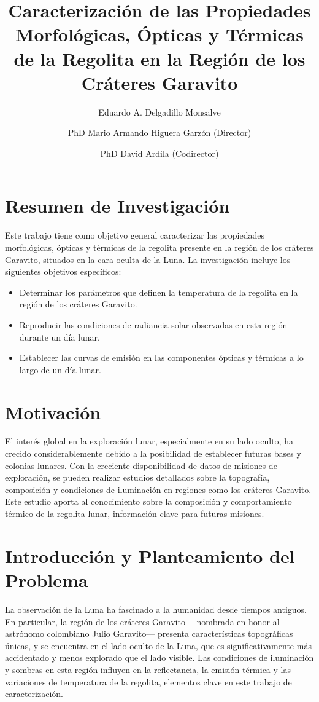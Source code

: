 \documentclass[12pt]{article}
\title{\Large\textbf{Caracterización de las Propiedades Morfológicas, Ópticas y Térmicas de la Regolita en la Región de los Cráteres Garavito}}
\author[1]{\raggedright Eduardo A. Delgadillo Monsalve}
\author[2]{\raggedright PhD Mario Armando Higuera Garzón (Director)}
\author[3]{\raggedright PhD David Ardila (Codirector)}
\affil[1]{\raggedright\small MSc estudiante - Astronomía (eadelgadillom@unal.edu.co) \newline \small Observatorio Astronómico Nacional, Universidad Nacional de Colombia}
\affil[2]{\raggedright\small Observatorio Astronómico Nacional, Universidad Nacional de Colombia}
\affil[3]{\raggedright\small Jet Propulsion Laboratory, NASA}
\date{}
\begin{document}
\maketitle

\section*{Resumen de Investigación}
Este trabajo tiene como objetivo general caracterizar las propiedades morfológicas, ópticas y térmicas de la regolita presente en la región de los cráteres Garavito, situados en la cara oculta de la Luna. La investigación incluye los siguientes objetivos específicos:
\begin{itemize}
    \item Determinar los parámetros que definen la temperatura de la regolita en la región de los cráteres Garavito.
    \item Reproducir las condiciones de radiancia solar observadas en esta región durante un día lunar.
    \item Establecer las curvas de emisión en las componentes ópticas y térmicas a lo largo de un día lunar.
\end{itemize}

\section*{Motivación}
El interés global en la exploración lunar, especialmente en su lado oculto, ha crecido considerablemente debido a la posibilidad de establecer futuras bases y colonias lunares. Con la creciente disponibilidad de datos de misiones de exploración, se pueden realizar estudios detallados sobre la topografía, composición y condiciones de iluminación en regiones como los cráteres Garavito. Este estudio aporta al conocimiento sobre la composición y comportamiento térmico de la regolita lunar, información clave para futuras misiones.

\section*{Introducción y Planteamiento del Problema}
La observación de la Luna ha fascinado a la humanidad desde tiempos antiguos. En particular, la región de los cráteres Garavito —nombrada en honor al astrónomo colombiano Julio Garavito— presenta características topográficas únicas, y se encuentra en el lado oculto de la Luna, que es significativamente más accidentado y menos explorado que el lado visible. Las condiciones de iluminación y sombras en esta región influyen en la reflectancia, la emisión térmica y las variaciones de temperatura de la regolita, elementos clave en este trabajo de caracterización.
\end{document}

